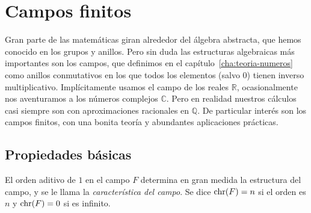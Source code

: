 %

\chapter{Campos finitos}
\label{cha:campos-finitos}

  Gran parte de las matemáticas
  giran alrededor del álgebra abstracta,%
  que hemos conocido en los grupos%
  y anillos.%
  Pero sin duda las estructuras algebraicas más importantes
  son los campos,%
  que definimos en el capítulo~\ref{cha:teoria-numeros}
  como anillos conmutativos en los que todos los elementos
  (salvo \(0\))
  tienen inverso multiplicativo.
  Implícitamente usamos el campo de los reales \(\mathbb{R}\),%
  ocasionalmente nos aventuramos a los números complejos \(\mathbb{C}\).%
  Pero en realidad nuestros cálculos
  casi siempre son con aproximaciones racionales en \(\mathbb{Q}\).%
  De particular interés son los campos finitos,
  con una bonita teoría y abundantes aplicaciones prácticas.

\section{Propiedades básicas}
\label{sec:propiedades-campo}

  El orden aditivo de \(1\) en el campo \(F\)
  determina en gran medida la estructura del campo,
  y se le llama la \emph{característica del campo}.%
  Se dice
  \(\operatorname{chr}(F) = n\) si el orden es \(n\)
  y \(\operatorname{chr}(F) = 0\) si es infinito.


